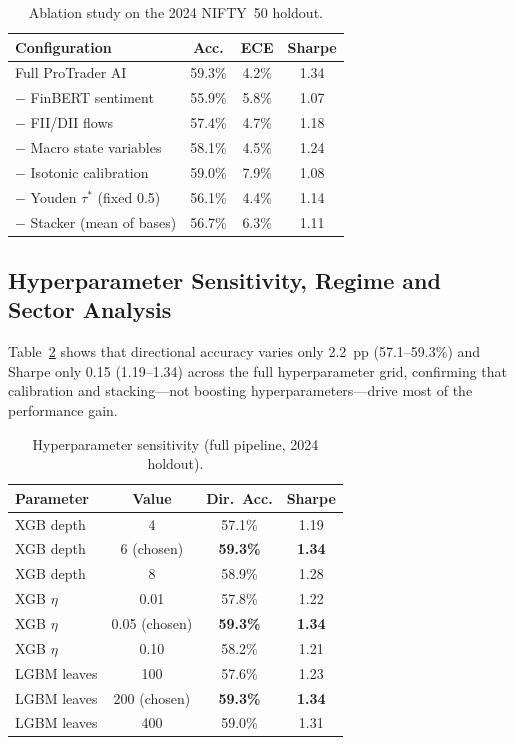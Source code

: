 \documentclass[12pt,a4paper]{article}
\begin{document}
\begin{table}[h]
\centering
\caption{Ablation study on the 2024 NIFTY~50 holdout.}
\label{tab:ablation}
\footnotesize
\begin{tabular}{lccc}
\toprule
\textbf{Configuration} & \textbf{Acc.} & \textbf{ECE} & \textbf{Sharpe} \\
\midrule
Full ProTrader AI            & 59.3\% & 4.2\% & 1.34 \\
$-$ FinBERT sentiment        & 55.9\% & 5.8\% & 1.07 \\
$-$ FII/DII flows            & 57.4\% & 4.7\% & 1.18 \\
$-$ Macro state variables    & 58.1\% & 4.5\% & 1.24 \\
$-$ Isotonic calibration     & 59.0\% & 7.9\% & 1.08 \\
$-$ Youden $\tau^*$ (fixed 0.5) & 56.1\% & 4.4\% & 1.14 \\
$-$ Stacker (mean of bases)  & 56.7\% & 6.3\% & 1.11 \\
\bottomrule
\end{tabular}
\end{table}

\subsection{Hyperparameter Sensitivity, Regime and Sector Analysis}

Table~\ref{tab:hyper} shows that directional accuracy varies only 2.2~pp (57.1--59.3\%)
and Sharpe only 0.15 (1.19--1.34) across the full hyperparameter grid, confirming
that calibration and stacking---not boosting hyperparameters---drive most of the
performance gain.

\begin{table}[h]
\centering
\caption{Hyperparameter sensitivity (full pipeline, 2024 holdout).}
\label{tab:hyper}
\footnotesize
\begin{tabular}{lccc}
\toprule
\textbf{Parameter} & \textbf{Value} & \textbf{Dir.\ Acc.} & \textbf{Sharpe} \\
\midrule
XGB depth   & 4           & 57.1\% & 1.19 \\
XGB depth   & 6 (chosen)  & \textbf{59.3\%} & \textbf{1.34} \\
XGB depth   & 8           & 58.9\% & 1.28 \\
XGB $\eta$  & 0.01        & 57.8\% & 1.22 \\
XGB $\eta$  & 0.05 (chosen) & \textbf{59.3\%} & \textbf{1.34} \\
XGB $\eta$  & 0.10        & 58.2\% & 1.21 \\
LGBM leaves & 100         & 57.6\% & 1.23 \\
LGBM leaves & 200 (chosen) & \textbf{59.3\%} & \textbf{1.34} \\
LGBM leaves & 400         & 59.0\% & 1.31 \\
\bottomrule
\end{tabular}
\end{table}
\end{document}
